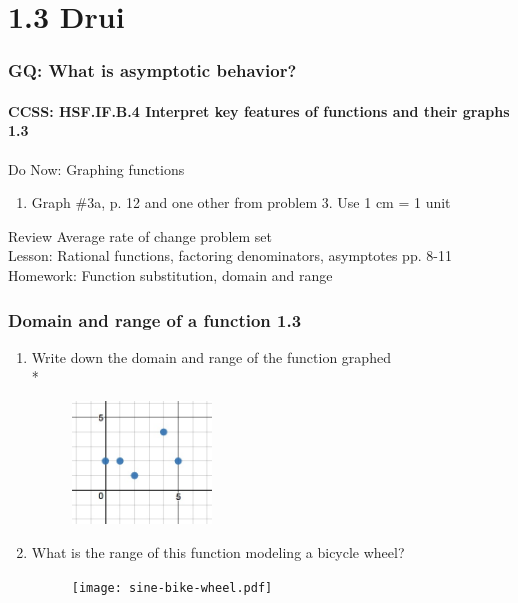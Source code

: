 \documentclass{beamer}
\begin{document}
  \section{1.3 Drui}
  \frame
  {
    \frametitle{GQ: What is asymptotic behavior?}
    \framesubtitle{CCSS: HSF.IF.B.4 Interpret key features of functions and their graphs  \alert{1.3}}

    \begin{block}{Do Now: Graphing functions}
    \begin{enumerate}
        \item Graph \#3a, p. 12 and one other from problem 3. Use 1 cm = 1 unit
    \end{enumerate}
    \end{block}
    Review Average rate of change problem set\\ \bigskip
    Lesson: Rational functions, factoring denominators, asymptotes pp. 8-11
    \\%
    Homework: Function substitution, domain and range
  }

\frame
{
  \frametitle{Domain and range of a function  \alert{1.3}}
  \begin{enumerate}
    \item Write down the domain and range of the function graphed\\*
    \begin{figure}[!ht]
        \centering
        \includegraphics[width=0.35\textwidth]{discrete-domain-graph.jpeg}
    \end{figure}

    \item What is the range of this function modeling a bicycle wheel?
    \begin{figure}[!ht]
        \centering
        \texttt{[image: sine-bike-wheel.pdf]}
    \end{figure}
  \end{enumerate}
  }
\end{document}
